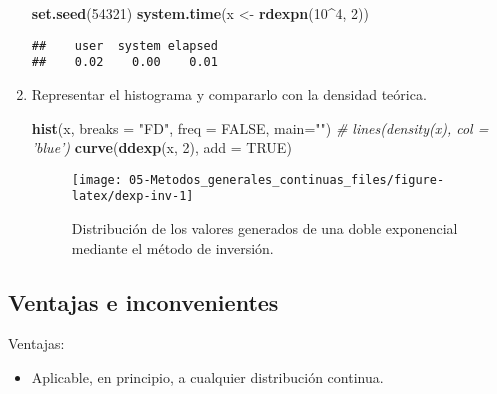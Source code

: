 \documentclass[
]{book}
\newenvironment{Shaded}{\begin{snugshade}}{\end{snugshade}}
\newcommand{\CommentTok}[1]{\textcolor[rgb]{0.56,0.35,0.01}{\textit{#1}}}
\newcommand{\DataTypeTok}[1]{\textcolor[rgb]{0.13,0.29,0.53}{#1}}
\newcommand{\DecValTok}[1]{\textcolor[rgb]{0.00,0.00,0.81}{#1}}
\newcommand{\KeywordTok}[1]{\textcolor[rgb]{0.13,0.29,0.53}{\textbf{#1}}}
\newcommand{\NormalTok}[1]{#1}
\newcommand{\OperatorTok}[1]{\textcolor[rgb]{0.81,0.36,0.00}{\textbf{#1}}}
\newcommand{\OtherTok}[1]{\textcolor[rgb]{0.56,0.35,0.01}{#1}}
\newcommand{\StringTok}[1]{\textcolor[rgb]{0.31,0.60,0.02}{#1}}
\providecommand{\tightlist}{%
  \setlength{\itemsep}{0pt}\setlength{\parskip}{0pt}}
\theoremstyle{break}
\theoremstyle{definition}
\theoremstyle{definition}
\theoremstyle{definition}
\theoremstyle{remark}
\begin{document}
\begin{enumerate}
\begin{Shaded}
\begin{Highlighting}[]
\KeywordTok{set.seed}\NormalTok{(}\DecValTok{54321}\NormalTok{)}
\KeywordTok{system.time}\NormalTok{(x <-}\StringTok{ }\KeywordTok{rdexpn}\NormalTok{(}\DecValTok{10}\OperatorTok{^}\DecValTok{4}\NormalTok{, }\DecValTok{2}\NormalTok{))}
\end{Highlighting}
\end{Shaded}

\begin{verbatim}
##    user  system elapsed 
##    0.02    0.00    0.01
\end{verbatim}
\item
  Representar el histograma y compararlo con la densidad teórica.

\begin{Shaded}
\begin{Highlighting}[]
\KeywordTok{hist}\NormalTok{(x, }\DataTypeTok{breaks =} \StringTok{"FD"}\NormalTok{, }\DataTypeTok{freq =} \OtherTok{FALSE}\NormalTok{, }\DataTypeTok{main=}\StringTok{""}\NormalTok{)}
\CommentTok{# lines(density(x), col = 'blue')}
\KeywordTok{curve}\NormalTok{(}\KeywordTok{ddexp}\NormalTok{(x, }\DecValTok{2}\NormalTok{), }\DataTypeTok{add =} \OtherTok{TRUE}\NormalTok{)}
\end{Highlighting}
\end{Shaded}

  \begin{figure}[!htb]

  {\centering \texttt{[image: 05-Metodos\_generales\_continuas\_files/figure-latex/dexp-inv-1]} 

  }

  \caption{Distribución de los valores generados de una doble exponencial mediante el método de inversión.}\label{fig:dexp-inv}
  \end{figure}
\end{enumerate}

\hypertarget{ventajas-e-inconvenientes}{%
\subsection{Ventajas e inconvenientes}\label{ventajas-e-inconvenientes}}

Ventajas:

\begin{itemize}
\tightlist
\item
  Aplicable, en principio, a cualquier distribución continua.
\end{itemize}
\end{document}
